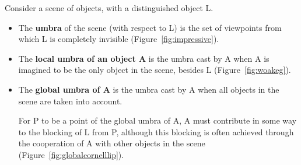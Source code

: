 \documentclass[9pt,twocolumn]{article}
\newif\ifJournal
\begin{document}
\begin{defn2}
\label{defn:localglobal}
Consider a scene of objects, with a distinguished object L.
\ifJournal
  \begin{itemize}
  \item The {\bf L-umbra} is the locus of points from which L is completely invisible.
  \item The {\bf L-penumbra} is the locus of points from which L is partially visible.
  \item The {\bf L-illumina}\footnote{We are unaware of any term for this type of region, so
    a new term is introduced, derived from the Latin for 'within the light'.}
  is the locus of points from which L is completely visible
  (i.e., no object blocks the view of L).
  \end{itemize}
  When L is clear from context, these terms 
  will be shortened to umbra, penumbra and illumina.
\fi

\ifJournal
  We begin with a definition of the three regions of object visibility.
\fi

\begin{itemize}
\item
The {\bf umbra} of the scene (with respect to L)
is the set of viewpoints from which L is completely invisible (Figure~\ref{fig:impressive}).
\item
The {\bf local umbra of an object A} is 
the umbra 
cast by A when A is imagined to be the only object in the scene, besides L (Figure~\ref{fig:woakeg}).
\item
The {\bf global umbra of A} is the umbra 
cast by A when all objects in the scene are taken into account.
\ifJournal
The {\bf local and global penumbra of A} are defined analogously.
\fi
For P to be a point of the global umbra of A, 
A must contribute in some way to the blocking of L from P,
although this blocking is often achieved through the cooperation of A with other objects
in the scene (Figure~\ref{fig:globalcornelllip}).
\end{itemize}
\end{defn2}
\end{document}
